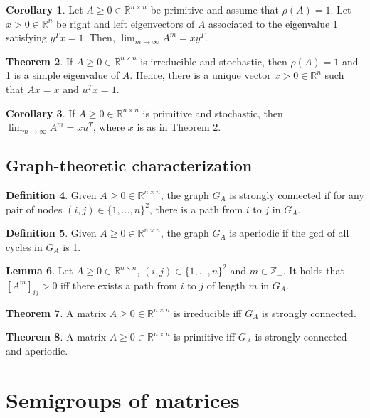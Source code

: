\documentclass[12pt, openany]{report}
\theoremstyle{definition}
\newtheorem{thm}{Theorem}[chapter]
\newtheorem{definition}[thm]{Definition}
\newtheorem{lem}[thm]{Lemma}
\newtheorem{corollary}[thm]{Corollary}
\newcommand{\R}{\mathbb{R}}
\begin{document}
\begin{corollary}
    Let $A\ge 0\in \R^{n\times n}$  be primitive and assume that $\rho(A)=1$. Let $x>0\in \R^n$ be right and left eigenvectors of $A$ associated to the eigenvalue 1 satisfying $y^Tx = 1$. Then, $\lim_{m\rightarrow \infty}A^m = xy^T$. 
\end{corollary}
\begin{thm}\label{thm:7.5}
    If $A\ge 0\in \R^{n\times n}$ is irreducible and stochastic, then $\rho(A)=1$ and 1 is a simple eigenvalue of $A$. Hence, there is a unique vector $x>0\in \R^n$ such that $Ax=x$ and $u^Tx=1$.
\end{thm}
\begin{corollary}
    If $A\ge0\in \R^{n\times n}$ is primitive and stochastic, then $\lim_{m\rightarrow \infty}A^m =  xu^T$, where $x$ is as in Theorem \ref{thm:7.5}.
\end{corollary}
\section{Graph-theoretic characterization}
\begin{definition}
    Given $A\ge 0\in \R^{n\times n}$, the graph $G_A$ is strongly connected if for any pair of nodes $(i,j)\in \{1,\dots,n\}^2$, there is a path from $i$ to $j$ in $G_A$.
\end{definition}
\begin{definition}
    Given $A\ge 0\in \R^{n\times n}$, the graph $G_A$ is aperiodic if the gcd of all cycles in $G_A$ is 1. 
\end{definition}
\begin{lem}
    Let $A\ge 0\in \R^{n\times n}$, $(i,j)\in \{1,\dots,n\}^2$ and $m\in \mathbb{Z}_+$. It holds that $[A^m]_{ij}>0$ iff there exists a path from $i$ to $j$ of length $m$ in $G_A$.
\end{lem}
\begin{thm}
    A matrix $A\ge 0\in \R^{n\times n}$ is irreducible iff $G_A$ is strongly connected. 
\end{thm}
\begin{thm}
    A matrix $A\ge 0\in \R^{n\times n}$ is primitive iff $G_A$ is strongly connected and aperiodic. 
\end{thm}
\chapter{Semigroups of matrices}
\end{document}
